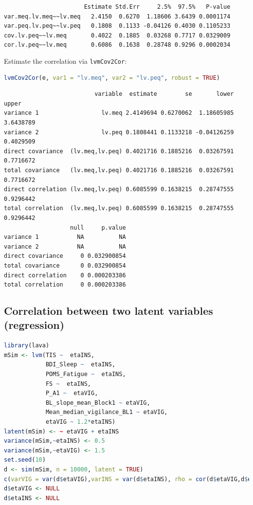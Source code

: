 \documentclass{article}
\begin{document}
\label{}
\begin{verbatim}
                       Estimate Std.Err     2.5%  97.5%   P-value
var.meq.lv.meq~~lv.meq   2.4150  0.6270  1.18606 3.6439 0.0001174
var.peq.lv.peq~~lv.peq   0.1808  0.1133 -0.04126 0.4030 0.1105233
cov.lv.peq~~lv.meq       0.4022  0.1885  0.03268 0.7717 0.0329009
cor.lv.peq~~lv.meq       0.6086  0.1638  0.28748 0.9296 0.0002034
\end{verbatim}


Estimate the correlation via \texttt{lvmCov2Cor}:
\begin{lstlisting}[language=r,numbers=none]
lvmCov2Cor(e, var1 = "lv.meq", var2 = "lv.peq", robust = TRUE)
\end{lstlisting}

\label{}
\begin{verbatim}
                          variable  estimate        se       lower     upper
variance 1                  lv.meq 2.4149694 0.6270062  1.18605985 3.6438789
variance 2                  lv.peq 0.1808441 0.1133218 -0.04126259 0.4029509
direct covariance  (lv.meq,lv.peq) 0.4021716 0.1885216  0.03267591 0.7716672
total covariance   (lv.meq,lv.peq) 0.4021716 0.1885216  0.03267591 0.7716672
direct correlation (lv.meq,lv.peq) 0.6085599 0.1638215  0.28747555 0.9296442
total correlation  (lv.meq,lv.peq) 0.6085599 0.1638215  0.28747555 0.9296442
                   null     p.value
variance 1           NA          NA
variance 2           NA          NA
direct covariance     0 0.032900854
total covariance      0 0.032900854
direct correlation    0 0.000203386
total correlation     0 0.000203386
\end{verbatim}
\subsection{Correlation between two latent variables (regression)}
\label{sec:org6103deb}

\begin{lstlisting}[language=r,numbers=none]
library(lava)
mSim <- lvm(TIS ~  etaINS,
            BDI_Sleep ~  etaINS,
            POMS_Fatigue ~  etaINS,
            FS ~  etaINS,
            P_A1 ~  etaVIG,
            BL_slope_mean_Block1 ~ etaVIG,
            Mean_median_vigilance_BL1 ~ etaVIG,
            etaVIG ~ 1.2*etaINS)
latent(mSim) <- ~ etaVIG + etaINS
variance(mSim,~etaINS) <- 0.5
variance(mSim,~etaVIG) <- 1.5
set.seed(10)
d <- sim(mSim, n = 10000, latent = TRUE)
c(varVIG = var(d$etaVIG),varINS = var(d$etaINS), rho = cor(d$etaVIG,d$etaINS))
d$etaVIG <- NULL
d$etaINS <- NULL
\end{lstlisting}
\end{document}
